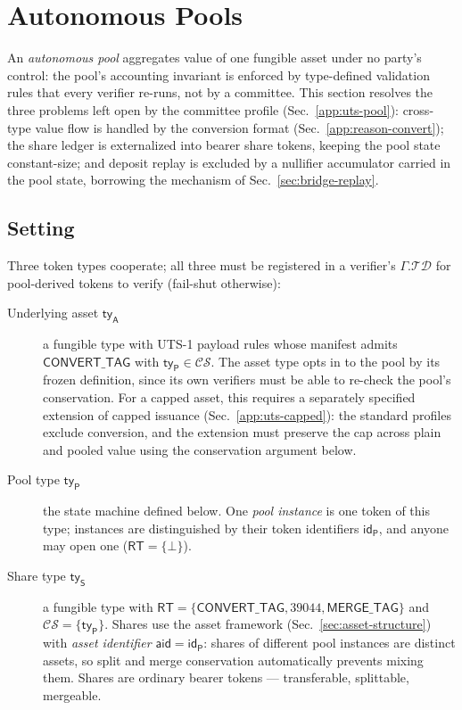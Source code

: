 \section{Autonomous Pools}\label{app:autonomous-pools}

An \emph{autonomous pool} aggregates value of one fungible asset under no party's control: the pool's accounting invariant is enforced by type-defined validation rules that every verifier re-runs, not by a committee. This section resolves the three problems left open by the committee profile (Sec.~\ref{app:uts-pool}): cross-type value flow is handled by the conversion format (Sec.~\ref{app:reason-convert}); the share ledger is externalized into bearer share tokens, keeping the pool state constant-size; and deposit replay is excluded by a nullifier accumulator carried in the pool state, borrowing the mechanism of Sec.~\ref{sec:bridge-replay}.

\subsection{Setting}

Three token types cooperate; all three must be registered in a verifier's $\Gamma.\mathcal{TD}$ for pool-derived tokens to verify (fail-shut otherwise):
\begin{description}
	\item[Underlying asset $\mathsf{ty}_\mathsf{A}$] a fungible type with UTS-1 payload rules whose manifest admits $\mathsf{CONVERT\_TAG}$ with $\mathsf{ty}_\mathsf{P} \in \mathcal{CS}$. The asset type opts in to the pool by its frozen definition, since its own verifiers must be able to re-check the pool's conservation. For a capped asset, this requires a separately specified extension of capped issuance (Sec.~\ref{app:uts-capped}): the standard profiles exclude conversion, and the extension must preserve the cap across plain and pooled value using the conservation argument below.
	\item[Pool type $\mathsf{ty}_\mathsf{P}$] the state machine defined below. One \emph{pool instance} is one token of this type; instances are distinguished by their token identifiers $\mathsf{id}_\mathsf{P}$, and anyone may open one ($\mathsf{RT} = \{\bot\}$).
	\item[Share type $\mathsf{ty}_\mathsf{S}$] a fungible type with $\mathsf{RT} = \{\mathsf{CONVERT\_TAG}, 39044, \mathsf{MERGE\_TAG}\}$ and $\mathcal{CS} = \{\mathsf{ty}_\mathsf{P}\}$. Shares use the asset framework (Sec.~\ref{sec:asset-structure}) with \emph{asset identifier $\mathsf{aid} = \mathsf{id}_\mathsf{P}$}: shares of different pool instances are distinct assets, so split and merge conservation automatically prevents mixing them. Shares are ordinary bearer tokens --- transferable, splittable, mergeable.
\end{description}


